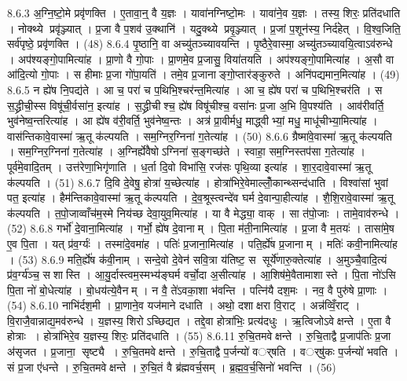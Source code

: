 8.6.3
अ॒ग्नि॒ष्टो॒मे प्रवृ॑णक्ति । ए॒तावा॒न्॒ वै य॒ज्ञः । यावा॑नग्निष्टो॒मः । यावा॑ने॒व य॒ज्ञः । तस्य॒ शिरः॒ प्रति॑दधाति । नोक्थ्ये प्रवृ॑ञ्ज्यात् । प्र॒जा वै प॒शव॑ उ॒क्थानि॑ । यदु॒क्थ्ये प्रवृ॒ञ्ज्यात् । प्र॒जां प॒शून॑स्य॒ निर्द॑हेत् । वि॒श्व॒जिति॒ सर्व॑पृष्ठे॒ प्रवृ॑णक्ति । (48)
8.6.4
पृ॒ष्ठानि॒ वा अच्यु॑तञ्च्यावयन्ति । पृ॒ष्ठैरे॒वास्मा॒ अच्यु॑तञ्च्यावयि॒त्वाऽव॑रुन्धे । अप॑श्यङ्गो॒पामित्या॑ह । प्रा॒णो वै गो॒पाः । प्रा॒णमे॒व प्र॒जासु॒ विया॑तयति । अप॑श्यङ्गो॒पामित्या॑ह । अ॒सौ वा आ॑दि॒त्यो गो॒पाः । स हीमाः प्र॒जा गो॑पा॒यति॑ । तमे॒व प्र॒जानाङ्गो॒प्तार॑ङ्कुरुते । अनि॑पद्यमान॒मित्या॑ह । (49)
8.6.5
न ह्ये॑ष नि॒पद्य॑ते । आ च॒ परा॑ च प॒थिभि॒श्चर॑न्त॒मित्या॑ह । आ च॒ ह्ये॑ष परा॑ च प॒थिभि॒श्चर॑ति । स स॒द्ध्रीची॒स्स विषू॑ची॒र्वसा॑न॒ इत्या॑ह । स॒द्ध्रीचीश्च॒ ह्ये॑ष विषू॑चीश्च॒ वसा॑नः प्र॒जा अ॒भि वि॒पश्य॑ति । आव॑रीवर्ति॒ भुव॑नेष्व॒न्तरित्या॑ह । आ ह्ये॑ष व॑री॒वर्ति॒ भुव॑नेष्व॒न्तः । अत्र॑ प्रा॒वीर्मधु॒ माद्ध्वीभ्यां॒ मधु॒ माधू॑चीभ्या॒मित्या॑ह । वास॑न्तिकावे॒वास्मा॑ ऋ॒तू क॑ल्पयति । सम॒ग्निर॒ग्निना॑ ग॒तेत्या॑ह । (50)
8.6.6
ग्रैष्मा॑वे॒वास्मा॑ ऋ॒तू क॑ल्पयति । सम॒ग्निर॒ग्निना॑ ग॒तेत्या॑ह । अ॒ग्निर्ह्ये॑वैषोऽग्निना॑ स॒ङ्गच्छ॑ते । स्वाहा॒ सम॒ग्निस्तप॑सा ग॒तेत्या॑ह । पूर्व॑मे॒वादि॒तम् । उत्त॑रेणा॒भिगृ॑णाति । ध॒र्ता दि॒वो विभा॑सि॒ रज॑सः पृथि॒व्या इत्या॑ह । शा॒र॒दावे॒वास्मा॑ ऋ॒तू क॑ल्पयति । (51)
8.6.7
दि॒वि दे॒वेषु॒ होत्रा॑ य॒च्छेत्या॑ह । होत्रा॑भिरे॒वेमाल्लोँ॒कान्थ्सन्द॑धाति । विश्वा॑सां भुवां पत॒ इत्या॑ह । हैम॑न्तिकावे॒वास्मा॑ ऋ॒तू क॑ल्पयति । दे॒व॒श्रूस्त्वन्दे॑व घर्म दे॒वान्पा॒हीत्या॑ह । शै॒शि॒रावे॒वास्मा॑ ऋ॒तू क॑ल्पयति । त॒पो॒जाव्वाँच॑म॒स्मे निय॑च्छ देवा॒युव॒मित्या॑ह । या वै मेद्ध्या॒ वाक् । सा त॑पो॒जाः । तामे॒वाव॑रुन्धे । (52)
8.6.8
गर्भो॑ दे॒वाना॒मित्या॑ह । गर्भो॒ ह्ये॑ष दे॒वानाम् । पि॒ता म॑ती॒नामित्या॑ह । प्र॒जा वै म॒तयः॑ । तासा॑मे॒ष ए॒व पि॒ता । यत् प्र॑व॒र्ग्यः॑ । तस्मा॑दे॒वमा॑ह । पतिः॑ प्र॒जाना॒मित्या॑ह । पति॒र्ह्ये॑ष प्र॒जानाम् । मतिः॑ कवी॒नामित्या॑ह । (53)
8.6.9
मति॒र्ह्ये॑ष क॑वी॒नाम् । सन्दे॒वो दे॒वेन॑ सवि॒त्रा य॑तिष्ट॒ स सूर्ये॑णारु॒क्तेत्या॑ह । अ॒मुञ्चै॒वादि॒त्यं प्र॑व॒र्ग्य॑ञ्च॒ सशास्ति । आ॒यु॒र्दास्त्वम॒स्मभ्य॑ङ्घर्म वर्चो॒दा अ॒सीत्या॑ह । आ॒शिष॑मे॒वैतामाशास्ते । पि॒ता नो॑ऽसि पि॒ता नो॑ बो॒धेत्या॑ह । बो॒धय॑त्ये॒वैनम् । न वै॒ ते॑ऽवका॒शा भ॑वन्ति । पत्नि॑यै दश॒मः । नव॒ वै पुरु॑षे प्रा॒णाः । (54)
8.6.10
नाभि॑र्दश॒मी । प्रा॒णाने॒व यज॑माने दधाति । अथो॒ दशाक्षरा वि॒राट् । अन्न॑व्विँ॒राट् । वि॒राजै॒वान्नाद्य॒मव॑रुन्धे । य॒ज्ञस्य॒ शिरोऽच्छिद्यत । तद्दे॒वा होत्रा॑भिः॒ प्रत्य॑दधुः । ऋ॒त्विजोऽवेक्षन्ते । ए॒ता वै होत्राः । होत्रा॑भिरे॒व य॒ज्ञस्य॒ शिरः॒ प्रति॑दधाति । (55)
8.6.11
रु॒चि॒तमवेक्षन्ते । रु॒चि॒ताद्वै प्र॒जाप॑तिः प्र॒जा अ॑सृजत । प्र॒जाना॒॒ सृष्ट्यै । रु॒चि॒तमवेक्षन्ते । रु॒चि॒ताद्वै प॒र्जन्यो॑ वर््षति । वर््षु॑कः प॒र्जन्यो॑ भवति । सं प्र॒जा ए॑धन्ते । रु॒चि॒तमवेक्षन्ते । रु॒चि॒तं वै ब्र॑ह्मवर्च॒सम् । ब्र॒ह्म॒व॒र्च॒सिनो॑ भवन्ति । (56)
